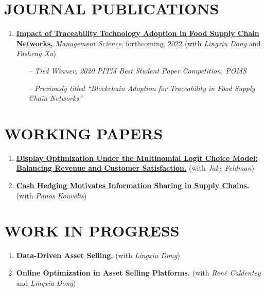 \documentclass[margin]{res} %
\begin{document}
\begin{resume}
\section{JOURNAL PUBLICATIONS}
\begin{enumerate}[leftmargin=*]
    \item %
        \href{https://pubsonline.informs.org/doi/abs/10.1287/mnsc.2022.4440?casa_token=br5-nMm53OIAAAAA:nQxcEPswA7DUJZgJ1CZsL0DModEzd-a-1Y5zOh68ebSQo1LU177cocuRpaC3BXYQcoELLTilwzPY}{\textbf{Impact of Traceability Technology Adoption in Food Supply Chain Networks,}} {\it Management Science}, forthcoming, 2022 (with {\it Lingxiu Dong} and {\it Fasheng Xu})
        \begin{itemize}
            \item[--] {\it Tied Winner, 2020 PITM Best Student Paper Competition, POMS}
            \item[--] {\it Previously titled ``Blockchain Adoption for Traceability in Food Supply Chain Networks''}
        \end{itemize}
\end{enumerate}


    \section{WORKING PAPERS}
    \begin{enumerate}[resume,leftmargin=*]
        \item \href{https://papers.ssrn.com/sol3/papers.cfm?abstract_id=3909033}{\textbf{Display Optimization Under the Multinomial Logit Choice Model: Balancing Revenue and Customer Satisfaction.}} (with {\it Jake Feldman})
        \item \href{https://papers.ssrn.com/sol3/papers.cfm?abstract_id=3936170}{\textbf{Cash Hedging Motivates Information Sharing in Supply Chains.}} (with {\it Panos Kouvelis})
    \end{enumerate}


    \section{WORK IN PROGRESS}
    \begin{enumerate}[resume,leftmargin=*]
        \item \textbf{Data-Driven Asset Selling.} (with {\it Lingxiu Dong})
        \item \textbf{Online Optimization in Asset Selling Platforms.} (with {\it Ren\'{e} Caldentey} and {\it Lingxiu Dong})
    \end{enumerate}




\end{resume}
\end{document}
